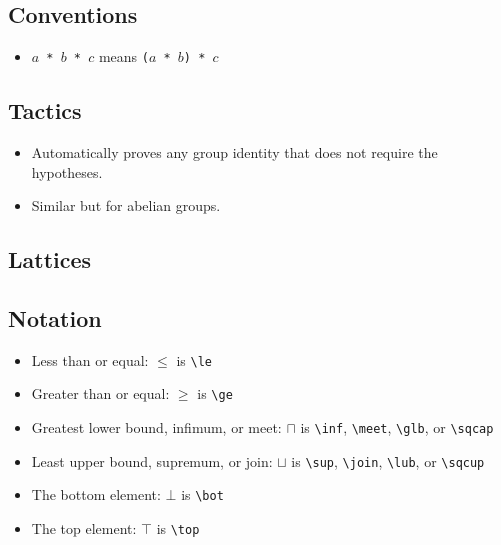 \documentclass[a4paper]{article}
\begin{document}
\subsection*{Conventions}

\begin{itemize}
    \item \texttt{$a$ * $b$ * $c$} means \texttt{($a$ * $b$) * $c$}
\end{itemize}

\subsection*{Tactics}


\begin{itemize}
    \item Automatically proves any group identity that does not require the hypotheses.
\end{itemize}


\begin{itemize}
    \item Similar but for abelian groups.
\end{itemize}

\subsection{Lattices}

\subsection*{Notation}

\begin{itemize}
    \item Less than or equal: $\le$ is \verb|\le|
    \item Greater than or equal: $\ge$ is \verb|\ge|
    \item Greatest lower bound, infimum, or meet: $\sqcap$ is \verb|\inf|, \verb|\meet|, \verb|\glb|, or \verb|\sqcap|
    \item Least upper bound, supremum, or join: $\sqcup$ is \verb|\sup|, \verb|\join|, \verb|\lub|, or \verb|\sqcup|
    \item The bottom element: $\bot$ is \verb|\bot|
    \item The top element: $\top$ is \verb|\top|
\end{itemize}
\end{document}
